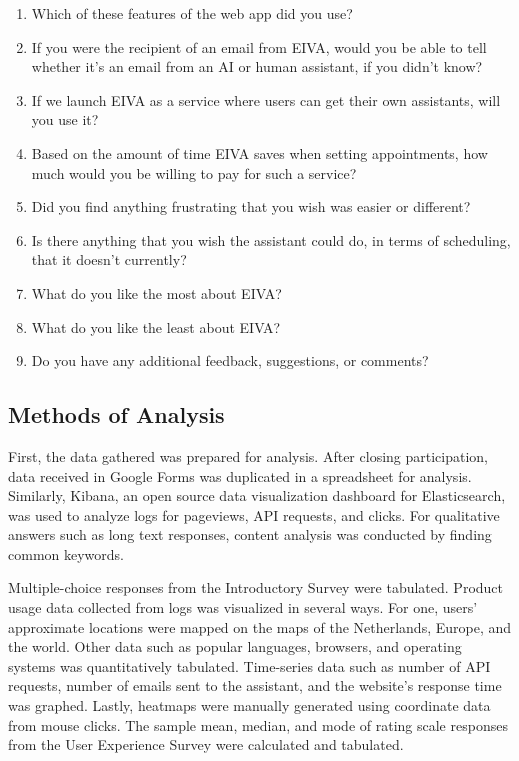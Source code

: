 \documentclass{article}
\begin{document}
\begin{enumerate}
	\item Which of these features of the web app did you use?
	\item If you were the recipient of an email from EIVA, would you be able to tell whether it's an email from an AI or human assistant, if you didn't know?
	\item If we launch EIVA as a service where users can get their own assistants, will you use it?
	\item Based on the amount of time EIVA saves when setting appointments, how much would you be willing to pay for such a service?
	\item Did you find anything frustrating that you wish was easier or different?
	\item Is there anything that you wish the assistant could do, in terms of scheduling, that it doesn't currently?
	\item What do you like the most about EIVA?
	\item What do you like the least about EIVA?
	\item Do you have any additional feedback, suggestions, or comments?
\end{enumerate}

\subsection{Methods of Analysis}

First, the data gathered was prepared for analysis. After closing participation, data received in Google Forms was duplicated in a spreadsheet for analysis. Similarly, Kibana, an open source data visualization dashboard for Elasticsearch, was used to analyze logs for pageviews, API requests, and clicks. For qualitative answers such as long text responses, content analysis was conducted by finding common keywords.

Multiple-choice responses from the Introductory Survey were tabulated. Product usage data collected from logs was visualized in several ways. For one, users' approximate locations were mapped on the maps of the Netherlands, Europe, and the world. Other data such as popular languages, browsers, and operating systems was quantitatively tabulated. Time-series data such as number of API requests, number of emails sent to the assistant, and the website's response time was graphed. Lastly, heatmaps were manually generated using coordinate data from mouse clicks. The sample mean, median, and mode of rating scale responses from the User Experience Survey were calculated and tabulated.
\end{document}
